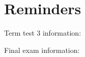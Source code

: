 \documentclass{article}
\begin{document}
\renewcommand{\familydefault}{\rmdefault}



\setcounter{page}{0}
\newpage
\tableofcontents
\newpage






\normalsize

\setcounter{page}{1}

\section*{Reminders}

\begin{notebox}
    Term test 3 information:
\end{notebox}
\begin{notebox}
    Final exam information:
\end{notebox}
\end{document}
